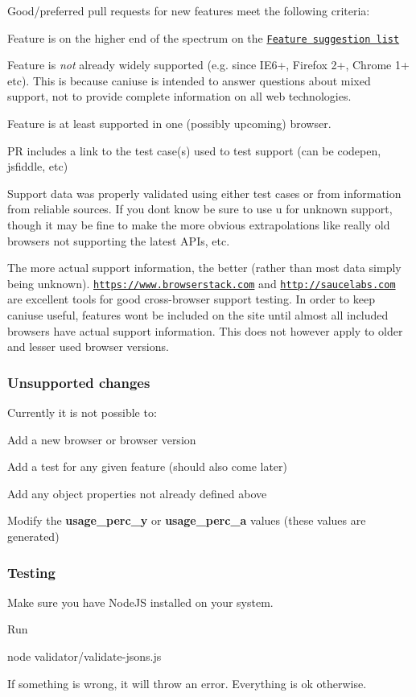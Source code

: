 Good/preferred pull requests for new features meet the following criteria\+:
\begin{DoxyItemize}
\item Feature is on the higher end of the spectrum on the \href{http://caniuse.com/issue-list/}{\tt Feature suggestion list}
\item Feature is {\itshape not} already widely supported (e.\+g. since I\+E6+, Firefox 2+, Chrome 1+ etc). This is because caniuse is intended to answer questions about mixed support, not to provide complete information on all web technologies.
\item Feature is at least supported in one (possibly upcoming) browser.
\item PR includes a link to the test case(s) used to test support (can be codepen, jsfiddle, etc)
\item Support data was properly validated using either test cases or from information from reliable sources. If you don\textquotesingle{}t know be sure to use {\ttfamily u} for unknown support, though it may be fine to make the more obvious extrapolations like really old browsers not supporting the latest A\+P\+Is, etc.
\item The more actual support information, the better (rather than most data simply being {\ttfamily u}nknown). \href{https://www.browserstack.com}{\tt https\+://www.\+browserstack.\+com} and \href{http://saucelabs.com}{\tt http\+://saucelabs.\+com} are excellent tools for good cross-\/browser support testing. In order to keep caniuse useful, features won\textquotesingle{}t be included on the site until almost all included browsers have actual support information. This does not however apply to older and lesser used browser versions.
\end{DoxyItemize}

\subsubsection*{Unsupported changes}

Currently it is not possible to\+:
\begin{DoxyItemize}
\item Add a new browser or browser version
\item Add a test for any given feature (should also come later)
\item Add any object properties not already defined above
\item Modify the {\bfseries usage\+\_\+perc\+\_\+y} or {\bfseries usage\+\_\+perc\+\_\+a} values (these values are generated)
\end{DoxyItemize}

\subsubsection*{Testing}

Make sure you have Node\+JS installed on your system.

Run

{\ttfamily node validator/validate-\/jsons.\+js}

If something is wrong, it will throw an error. Everything is ok otherwise. 